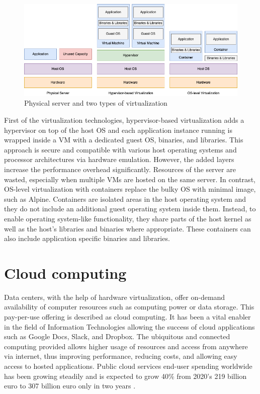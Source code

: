 \begin{figure}[ht]
  \begin{center}
    \includegraphics[width=13.5cm]{images/VirtualizationTypes.png}
    \caption{Physical server and two types of virtualization}
    \label{fig:VirtualizationTypes}
  \end{center}
\end{figure}

First of the virtualization technologies, hypervisor-based virtualization adds a hypervisor on top of the host OS and each application instance running is wrapped inside a VM with a dedicated guest OS, binaries, and libraries. This approach is secure and compatible with various host operating systems and processor architectures via hardware emulation. However, the added layers increase the performance overhead significantly. Resources of the server are wasted, especially when multiple VMs are hosted on the same server. In contrast, OS-level virtualization with containers replace the bulky OS with minimal image, such as Alpine. Containers are isolated areas in the host operating system and they do not include an additional guest operating system inside them. Instead, to enable operating system-like functionality, they share parts of the host kernel as well as the host’s libraries and binaries where appropriate. These containers can also include application specific binaries and libraries. \cite{Toimela2017}

\section{Cloud computing}

Data centers, with the help of hardware virtualization, offer on-demand availability of computer resources such as computing power or data storage. This pay-per-use offering is described as cloud computing. It has been a vital enabler in the field of Information Technologies allowing the success of cloud applications such as Google Docs, Slack, and Dropbox. The ubiquitous and connected computing provided allows higher usage of resources and access from anywhere via internet, thus improving performance, reducing costs, and allowing easy access to hosted applications. Public cloud services end-user spending worldwide has been growing steadily and is expected to grow 40\% from 2020's 219 billion euro to 307 billion euro only in two years \cite{PublicCloudStatista}.


